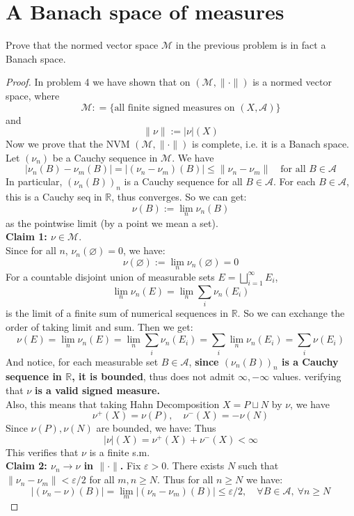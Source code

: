 \documentclass[lang=cn,11pt]{elegantbook}
\begin{document}
\section{A Banach space of measures}
  Prove that the normed vector space $\mathcal{M}$ in the previous problem is in fact a Banach space.
\begin{proof}
In problem 4 we have shown that on $(\mathcal{M}, \|\cdot\|)$ is a normed vector space, where \[
\mathcal{M} : = \{ \text{all finite signed measures on }(X, \mathcal{A})\}
\]
and  \[
\|\nu\| := |\nu|(X)
\]
Now we prove that the NVM $(\mathcal{M}, \|\cdot\|)$ is complete, i.e. it is a Banach space.\\
 Let $(\nu_n)$ be a Cauchy sequence in $\mathcal{M}$. We have
\[
|\nu_n(B) - \nu_m(B)| = |(\nu_n - \nu_m)(B)| \le \|\nu_n - \nu_m\| \quad \text{for all } B \in \mathcal{A}
\]
In particular, $(\nu_n(B))_n$ is a Cauchy sequence for all $B \in \mathcal{A}$. For each $B \in \mathcal{A}$, this is a Cauchy seq in $\mathbb{R}$, thus converges. So we can get: \[
\nu(B) := \lim_n \nu_n(B)
\]
as the pointwise limit (by a point we mean a set).\\
\textbf{Claim 1: $\nu \in \mathcal{M}$}.\\
Since for all $n$, $\nu_n(\varnothing) = 0$, we have:
\[
\nu(\varnothing) := \lim_n \nu_n(\varnothing) = 0
\]
For a countable disjoint union of measurable sets \(E = \bigsqcup_{i=1}^\infty E_i\), \[
 \lim_n   \nu_n(E) = \lim_n \sum_i \nu_n(E_i)
\]is the limit of a finite sum of numerical sequences in $\mathbb{R}$. So we can exchange the order of taking limit and sum. Then we get: \[
  \nu(E) = \lim_n \nu_n(E) = \lim_n \sum_i  \nu_n(E_i) = \sum_i \lim_n \nu_n(E_i) = \sum_i \nu(E_i)
  \]
And notice, for each measurable set $B\in \mathcal{A}$, \textbf{since $(\nu_n(B))_n$ is a Cauchy sequence in $\mathbb{R}$, it is bounded}, thus does not admit $\infty, -\infty$ values. verifying that $\nu$ \textbf{is a valid signed measure.}\\
Also, this means that taking Hahn Decomposition $X = P \sqcup N$ by $\nu$, we have \[
\nu^+ (X) = \nu(P ) ,\quad \nu^- (X) = -\nu(N) 
\]
Since $\nu(P), \nu(N)$ are bounded, we have:
Thus \[
|\nu| (X) =  \nu^+ (X) + \nu^- (X)  < \infty
\]
This verifies that $\nu$ is a finite s.m.\\
\textbf{ Claim 2:  $\nu_n \to \nu$ in $\|\cdot\|$.}
Fix $\varepsilon > 0$. There exists $N$ such that $\|\nu_n - \nu_m\| < \varepsilon / 2$ for all $m, n \ge N$. Thus for all $n\geq N$ we have:
\[
|(\nu_n - \nu)(B)| = \lim_{m} |(\nu_n - \nu_m)(B)| \le \varepsilon / 2, \quad \forall B \in \mathcal{A},\ \forall n \ge N
\]
\end{proof}
\end{document}
